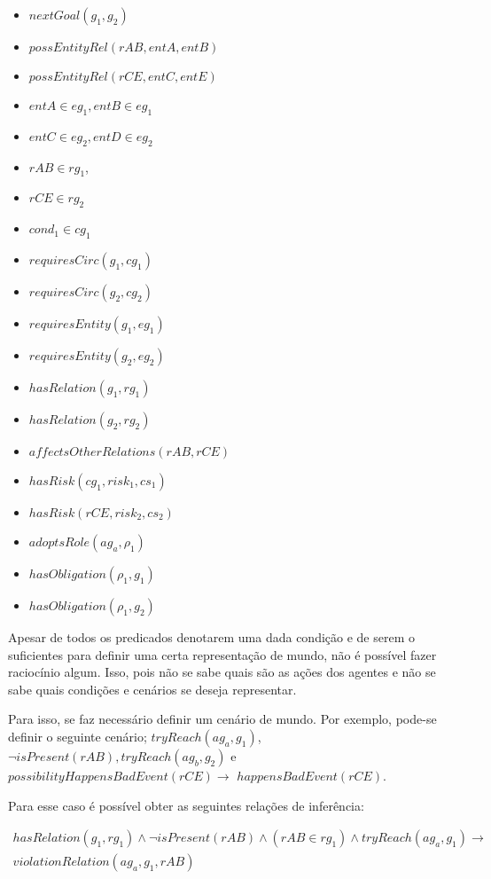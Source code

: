 \begin{itemize}
    \item $nextGoal(g_1,g_2)$
    \item $possEntityRel(rAB,entA,entB)$
    \item $possEntityRel(rCE,entC,entE)$
    \item $entA \in eg_1 ,entB \in eg_1$
    \item $entC \in eg_2, entD \in eg_2$
    \item $rAB \in rg_1$,
    \item $rCE \in rg_2 $
    \item $cond_1 \in {cg_1} $
    \item $ requiresCirc(g_1,cg_1)$
    \item $ requiresCirc(g_2,cg_2 )$
    \item $ requiresEntity(g_1,eg_1) $
    \item $ requiresEntity(g_2,eg_2) $
    \item $ hasRelation(g_1, rg_1 )$
    \item $ hasRelation(g_2, rg_2)$ 
    \item $ affectsOtherRelations(rAB,rCE) $ 
    \item $hasRisk(cg_1,risk_1,cs_1)$
    \item $hasRisk(rCE,risk_2,cs_2)$
    \item $adoptsRole(ag_a,\rho_1)$
    \item $hasObligation(\rho_1,g_1)$
    \item $hasObligation(\rho_1,g_2)$
\end{itemize}

Apesar de todos os predicados denotarem uma dada condição e de serem o suficientes para definir uma certa representação de mundo, não é possível fazer raciocínio algum. Isso, pois não se sabe quais são as ações dos agentes e não se sabe quais condições e cenários se deseja representar.  

Para isso, se faz necessário definir um cenário de mundo. Por exemplo, pode-se definir o seguinte cenário; $tryReach(ag_a,g_1)$, $\neg isPresent(rAB), tryReach(ag_b,g_2)$ e $ possibilityHappensBadEvent(rCE) \to $ $happensBadEvent(rCE)$. 

Para esse caso é possível obter as seguintes relações de inferência: 

\begin{eqnarray}
    hasRelation(g_1,rg_1)\wedge \neg isPresent(rAB) \wedge (rAB \in rg_1) \wedge tryReach(ag_a,g_1) \to \nonumber \\
    violationRelation(ag_a,g_1,rAB) 
\end{eqnarray}

